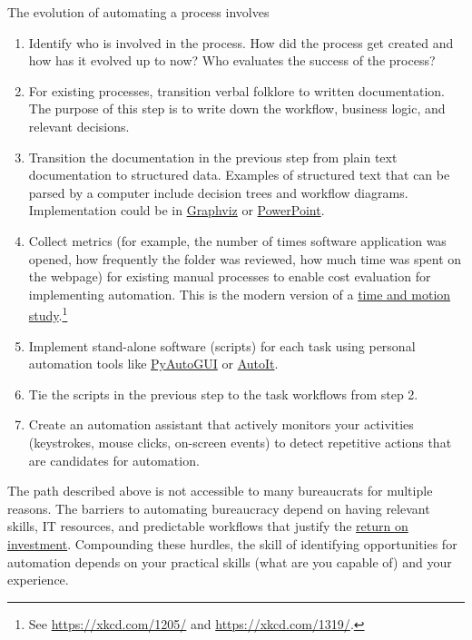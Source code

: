 The evolution of automating a process involves
\begin{enumerate}
    \item Identify who is involved in the process. How did the process get created and how has it evolved up to now? Who evaluates the success of the process? 
    \item For existing processes, transition verbal folklore to written documentation. The purpose of this step is to write down the workflow, business logic, and relevant decisions. 
    \item Transition the documentation in the previous step from plain text documentation to structured data. Examples of structured text that can be parsed by a computer include  decision trees and workflow diagrams. Implementation could be in 
    \href{https://en.wikipedia.org/wiki/Graphviz}{Graphviz} or  \href{https://en.wikipedia.org/wiki/Microsoft_PowerPoint}{PowerPoint}.
    \item Collect metrics (for example, the number of times software application was opened, how frequently the folder was reviewed, how much  time was spent on the webpage) for existing manual processes to enable cost evaluation for implementing automation. This is the modern version of a
    \href{https://en.wikipedia.org/wiki/Time_and_motion_study}{time and motion study}.\footnote{See \href{https://xkcd.com/1205/}{https://xkcd.com/1205/} and \href{https://xkcd.com/1319/}{https://xkcd.com/1319/}.}
    \item Implement stand-alone software (scripts) for each task using personal automation tools like \href{https://pyautogui.readthedocs.io/en/latest/}{PyAutoGUI} or \href{https://www.autoitscript.com/site/}{AutoIt}.
    \item Tie the scripts in the previous step to the task workflows from step 2.
    \item Create an automation assistant that actively monitors your activities (keystrokes, mouse clicks, on-screen events) to detect repetitive actions that are candidates for automation.
\end{enumerate}

The path described above is not accessible to many bureaucrats for multiple reasons. 
The barriers to automating bureaucracy depend on having relevant skills, IT resources, and predictable workflows that justify the
\href{https://en.wikipedia.org/wiki/Return_on_investment}{return on investment}. Compounding these hurdles, the skill of identifying opportunities for automation depends on your practical skills (what are you capable of) and your experience.

